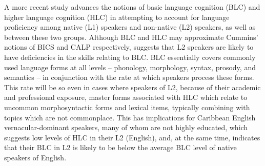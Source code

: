 \documentclass[output=paper,colorlinks,citecolor=brown]{langscibook}
\begin{document}
A more recent study \citep{Hulstijn2011} advances the notions of basic language cognition (BLC) and higher language cognition (HLC) in attempting to account for language proficiency among native (L1) speakers and non-native (L2) speakers, as well as between these two groups. Although BLC and HLC may approximate Cummins’ notions of BICS and CALP respectively, \citet{Hulstijn2011} suggests that L2 speakers are likely to have deficiencies in the skills relating to BLC.  BLC essentially covers commonly used language forms at all levels -- phonology, morphology, syntax, prosody, and semantics -- in conjunction with the rate at which speakers process these forms. This rate will be so even in cases where speakers of L2, because of their academic and professional exposure, master forms associated with HLC which relate to uncommon morphosyntactic forms and lexical items, typically combining with topics which are not commonplace. This has implications for Caribbean English vernacular-dominant speakers, many of whom are not highly educated, which suggests low levels of HLC in their L2 (English), and, at the same time, indicates that their BLC in L2 is likely to be below the average BLC level of native speakers of English.
\end{document}
